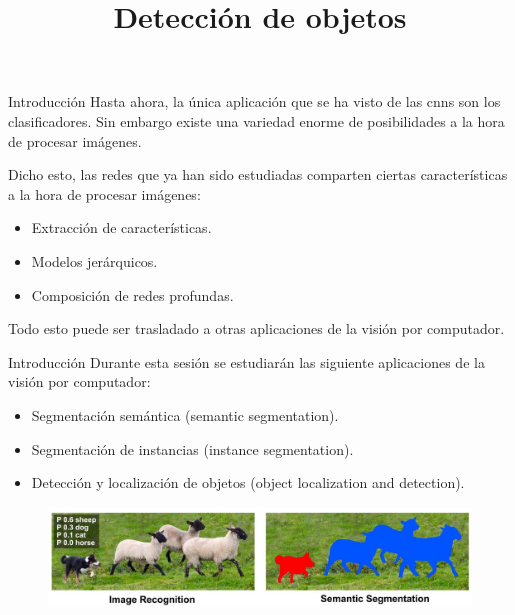 



\title{Detección de objetos}


\maketitle

\begin{frame}{Introducción}
Hasta ahora, la única \alert{aplicación} que se ha visto de las \alert{\glspl{cnn}} son los clasificadores. Sin embargo existe una variedad enorme de posibilidades a la hora de procesar imágenes.

Dicho esto, las redes que ya han sido estudiadas comparten ciertas características a la hora de \alert{procesar imágenes}:

\begin{itemize}
    \item Extracción de características.
    \item Modelos jerárquicos.
    \item Composición de redes profundas.
\end{itemize}

Todo esto puede ser \alert{trasladado} a otras aplicaciones de la \alert{visión por computador}.
\end{frame}

\begin{frame}{Introducción}
Durante esta sesión se estudiarán las siguiente aplicaciones de la visión por computador:
\begin{itemize}
    \item \alert{Segmentación semántica} (semantic segmentation).
    \item Segmentación de instancias (instance segmentation).
    \item Detección y localización de objetos (object localization and detection).
\end{itemize}

\begin{figure}
    \centering
    \includegraphics[width=\textwidth]{figures/Tema 4/SemanticSeg.jpg}
    \caption{\cite{SemanticSeg}}
\end{figure}
\end{frame}

